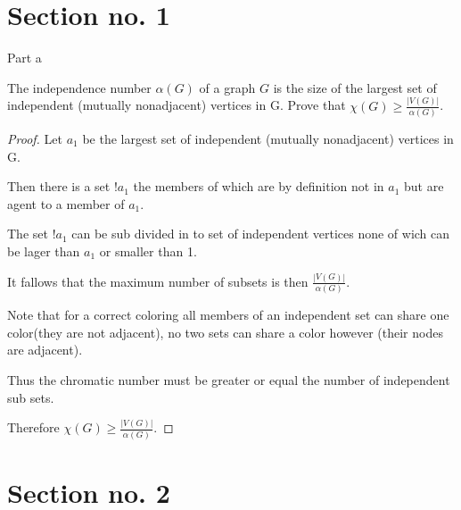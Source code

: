 \documentclass[9pt]{beamer}\usepackage[]{graphicx}\usepackage[]{color}
\begin{document}
\section{Section no. 1}
\begin{frame}{Part a }
    \begin{problem}
    The independence number $\alpha(G)$ of a graph $G$ is the size of the largest set of independent (mutually nonadjacent) vertices in G. Prove that $\chi(G) \ge \frac{|V (G)|}{\alpha(G)}$.
     \end{problem}
    \begin{proof}
        Let $a_1$ be the largest set of independent (mutually nonadjacent) vertices in G.

        Then there is a set $!a_1$ the members of which are by definition not in $a_1$ but are agent to a member of $a_1$.

        The set $!a_1$ can be sub divided in to set of independent vertices none of wich can be lager than $a_1$ or smaller than 1.

        It fallows that the maximum number of subsets is then $\frac{|V (G)|}{\alpha(G)}$.

        Note that for a correct coloring all members of an independent set can share one color(they are not adjacent), no two sets can share a color however (their nodes are adjacent).

        Thus the chromatic number must be greater or equal the number of independent sub sets.

        Therefore $\chi(G) \ge \frac{|V (G)|}{\alpha(G)}$.
    \end{proof}
\end{frame}

\section{Section no. 2}


\end{document}
